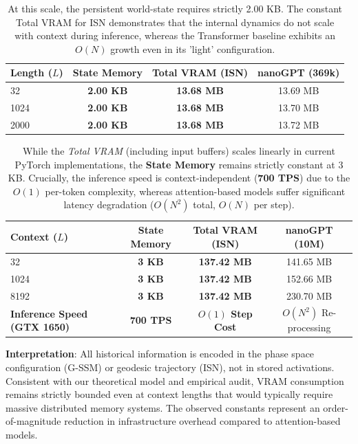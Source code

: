 \documentclass[12pt,a4paper]{article}
\begin{document}
\begin{table}[htbp]
    \centering
    \caption{Memory scaling (363k parameters) representing the O(1) trend.}
    \label{tab:memory-scaling}
    \begin{tabular}{lccc}
        \toprule
        \textbf{Length ($L$)} & \textbf{State Memory} & \textbf{Total VRAM (ISN)} & \textbf{nanoGPT (369k)} \\
        \midrule
        32         & \textbf{\textbf{2.00 KB}} & \textbf{13.68 MB} & 13.69 MB \\
        1024       & \textbf{\textbf{2.00 KB}} & \textbf{13.68 MB} & 13.70 MB \\
        2000       & \textbf{\textbf{2.00 KB}} & \textbf{13.68 MB} & 13.72 MB \\
        \bottomrule
    \end{tabular}
    \vspace{2pt}
    \caption*{\small At this scale, the persistent world-state requires strictly 2.00 KB. The constant Total VRAM for ISN demonstrates that the internal dynamics do not scale with context during inference, whereas the Transformer baseline exhibits an $O(N)$ growth even in its 'light' configuration.}
\end{table}

\begin{table}[h]
    \centering
    \small
    \caption{Agnostic Architectural Scalability (10M Parameters Scale)}
    \label{tab:10m-scaling}
    \begin{tabular}{lccc}
        \toprule
        \textbf{Context ($L$)} & \textbf{State Memory} & \textbf{Total VRAM (ISN)} & \textbf{nanoGPT (10M)} \\
        \midrule
        32         & \textbf{3 KB} & \textbf{137.42 MB} & 141.65 MB \\
        1024       & \textbf{3 KB} & \textbf{137.42 MB} & 152.66 MB \\
        8192       & \textbf{3 KB} & \textbf{137.42 MB} & 230.70 MB \\
        \midrule
        \textbf{Inference Speed (GTX 1650)} & \textbf{700 TPS} & \textbf{$O(1)$ Step Cost} & $O(N^2)$ Re-processing \\
        \bottomrule
    \end{tabular}
    \caption*{\small While the \textit{Total VRAM} (including input buffers) scales linearly in current PyTorch implementations, the \textbf{State Memory} remains strictly constant at 3 KB. Crucially, the inference speed is context-independent (\textbf{700 TPS}) due to the $O(1)$ per-token complexity, whereas attention-based models suffer significant latency degradation ($O(N^2)$ total, $O(N)$ per step).}
\end{table}
\noindent\textbf{Interpretation}: All historical information is encoded in the phase space configuration (G-SSM) or geodesic trajectory (ISN), not in stored activations. Consistent with our theoretical model and empirical audit, VRAM consumption remains strictly bounded even at context lengths that would typically require massive distributed memory systems. The observed constants represent an order-of-magnitude reduction in infrastructure overhead compared to attention-based models.
\end{document}
